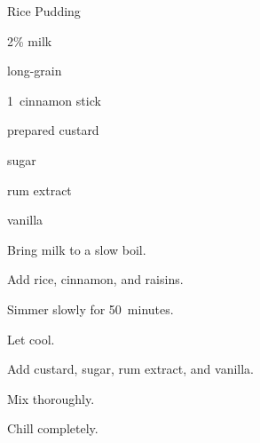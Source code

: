 \begin{recipe}{Rice Pudding}{}{}

\begin{ingredients}
\item {} 2\% milk
\item {} long-grain 
\item 1~cinnamon stick
\item \C{\quarter} 
\item \C{\third} prepared custard
\item \C{\third} sugar
\item {} rum extract
\item {} vanilla
\end{ingredients}

\begin{directions}
\item Bring milk to a slow boil.
\item Add rice, cinnamon, and raisins.
\item Simmer slowly for 50~minutes.
\item Let cool.
\item Add custard, sugar, rum extract, and vanilla.
\item Mix thoroughly.
\item Chill completely.
\end{directions}

\end{recipe}

